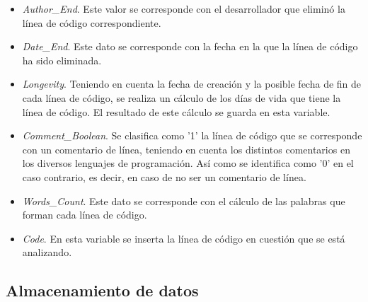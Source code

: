\documentclass[a4paper, 12pt]{book}
\begin{document}
\begin{itemize}
  \item \textit{Author\_End}. Este valor se corresponde con el desarrollador que eliminó la línea de código correspondiente.
  \item \textit{Date\_End}.   Este dato se corresponde con la fecha en la que la línea de código ha sido eliminada.
  \item \textit{Longevity}. Teniendo en cuenta la fecha de creación y la posible fecha de fin de cada línea de código, se realiza un cálculo de los días de vida que tiene la línea de código. El resultado de este cálculo se guarda en esta variable.
  \item \textit{Comment\_Boolean}. Se clasifica como '1' la línea de código que se corresponde con un comentario de línea, teniendo en cuenta los distintos comentarios en los diversos lenguajes de programación. Así como se identifica como '0' en el
  caso contrario, es decir, en caso de no ser un comentario de línea.
  \item \textit{Words\_Count}. Este dato se corresponde con el cálculo de las palabras que forman cada línea de código. 
  \item \textit{Code}. En esta variable se inserta la línea de código en cuestión que se está analizando.
\end{itemize}

\subsection{Almacenamiento de datos}
\label{subsec:almacenamiento}
\end{document}
